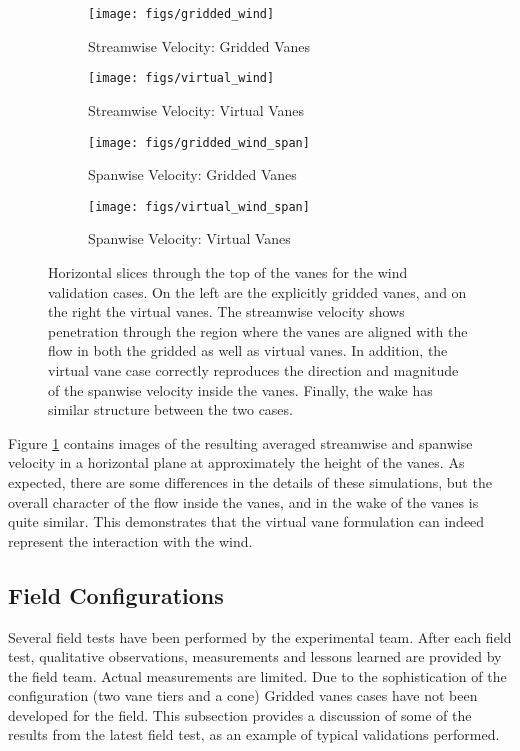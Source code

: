 \begin{figure}[htb]

 \begin{subfigure}{.5\textwidth}
  \centering
  \texttt{[image: figs/gridded\_wind]}
  \caption{Streamwise Velocity: Gridded Vanes}
 \end{subfigure}%
 \begin{subfigure}{.5\textwidth}
  \centering
  \texttt{[image: figs/virtual\_wind]}
  \caption{Streamwise Velocity: Virtual Vanes}
 \end{subfigure}%


 \begin{subfigure}{.5\textwidth}
  \centering
  \texttt{[image: figs/gridded\_wind\_span]}
  \caption{Spanwise Velocity: Gridded Vanes}
 \end{subfigure}%
 \begin{subfigure}{.5\textwidth}
  \centering
  \texttt{[image: figs/virtual\_wind\_span]}
  \caption{Spanwise Velocity: Virtual Vanes}
 \end{subfigure}%

 \caption{Horizontal slices through the top of the vanes for the
 wind validation cases. On the left are the explicitly gridded vanes,
 and on the right the virtual vanes. The streamwise velocity shows
 penetration through the region where the vanes are aligned with the
 flow in both the gridded as well as virtual vanes. In addition, the
 virtual vane case correctly reproduces the direction and magnitude of
 the spanwise velocity inside the vanes. Finally, the wake has similar
 structure between the two cases.}
 \label{fig:wind_val}
\end{figure}

Figure \ref{fig:wind_val} contains images of the resulting averaged
streamwise and  spanwise velocity in a horizontal plane at approximately
the height of the vanes. As expected, there are some differences in the
details of these simulations, but the overall character of the flow
inside the vanes, and in the wake of the vanes is quite similar. This
demonstrates that the virtual vane formulation can indeed represent the
interaction with the wind. 

\subsection{Field Configurations}

Several field tests have been performed by the experimental team. After
each field test, qualitative observations, measurements and lessons
learned are provided by the field team. Actual measurements
are limited. Due to the sophistication of the configuration
(two vane tiers and a cone) Gridded vanes cases have not been developed
for the field. This subsection provides a discussion of some of
the results from the latest field test, as an example of typical
validations performed. 

